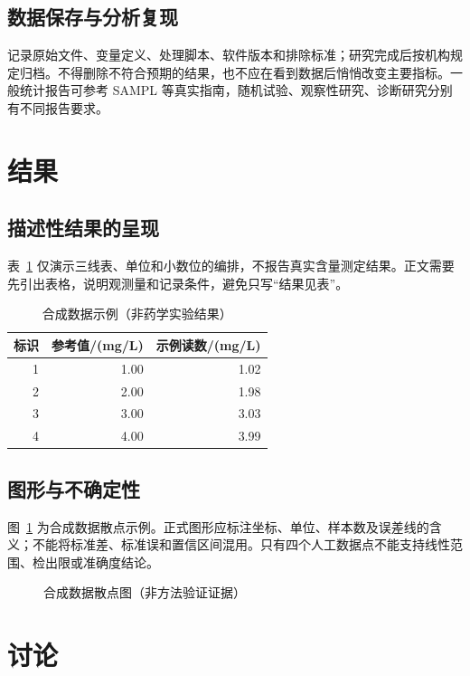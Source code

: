 \subsection{数据保存与分析复现}
记录原始文件、变量定义、处理脚本、软件版本和排除标准；研究完成后按机构规定归档。不得删除不符合预期的结果，也不应在看到数据后悄悄改变主要指标。一般统计报告可参考 SAMPL 等真实指南\cite{sampl2015}，随机试验、观察性研究、诊断研究分别有不同报告要求\cite{consort2010,strobe2007}。
\clearpage\section{结果}
\subsection{描述性结果的呈现}
表~\ref{tab:synthetic-med} 仅演示三线表、单位和小数位的编排，不报告真实含量测定结果。正文需要先引出表格，说明观测量和记录条件，避免只写“结果见表”。
\begin{table}[htbp]\centering\caption{合成数据示例（非药学实验结果）}\label{tab:synthetic-med}
{\begin{tabular}{rrr}\toprule 标识 & 参考值/(mg/L) & 示例读数/(mg/L)\\\midrule
1&1.00&1.02\\2&2.00&1.98\\3&3.00&3.03\\4&4.00&3.99\\\bottomrule\end{tabular}}
\end{table}
\subsection{图形与不确定性}
图~\ref{fig:synthetic-med} 为合成数据散点示例。正式图形应标注坐标、单位、样本数及误差线的含义；不能将标准差、标准误和置信区间混用。只有四个人工数据点不能支持线性范围、检出限或准确度结论。
\begin{figure}[htbp]\centering{}
\caption{合成数据散点图（非方法验证证据）}\label{fig:synthetic-med}
\end{figure}
\clearpage\section{讨论}
